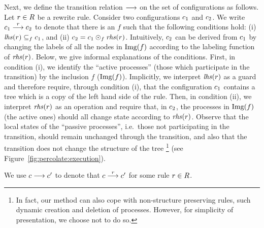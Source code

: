 Next, we define the transition relation $\stackrel{}\longrightarrow$ on the set of configurations
as follows.
%
Let $r\in R$ be a rewrite rule.
%
Consider two configurations $c_1$ and $c_2$.
%
We write $c_1\stackrel{r}\longrightarrow c_2$ to denote that there is an $f$ such that 
the following conditions hold:
%
(i) ${\it lhs}({r})\subseteq_fc_1$, and
(ii) $c_2=c_1\odot_f{\it rhs}({r})$.
%
Intuitively, $c_2$ can be derived from $c_1$ by changing the labels of all the nodes in 
$\text{Img}({f})$ according to the labeling function of ${\it rhs}({r})$.
%
Below, we give informal explanations of the conditions.
%
First, in condition (i), we identify the ``active processes'' (those which participate
in the transition) by the inclusion $f$ ($\text{Img}({f})$).
%
Implicitly, we interpret ${\it lhs}({r})$ as a guard and therefore require, through condition (i),
that the configuration $c_1$ contains a tree which is a copy of the left hand side
of the rule. 
%
Then, in condition (ii), we interpret ${\it rhs}({r})$ as an operation and require that,
in $c_2$, the processes in $\text{Img}({f})$ (the active ones) should all change state according to 
${\it rhs}({r})$.
%
Observe that the local states of the ``passive processes'', i.e.\ those not participating in the transition, 
should remain unchanged through the transition, and also that the transition does not change the structure 
of the tree
%
\footnote{In fact, our method can also cope with non-structure preserving rules, such dynamic
creation and deletion of processes. However, for simplicity of presentation, we choose not 
to do so.} (see Figure~\ref{fig:percolate:execution}).
%

We use $c\stackrel{}\longrightarrow c'$ to denote that $c\stackrel{r}\longrightarrow c'$ 
for some rule $r\in R$.
%

